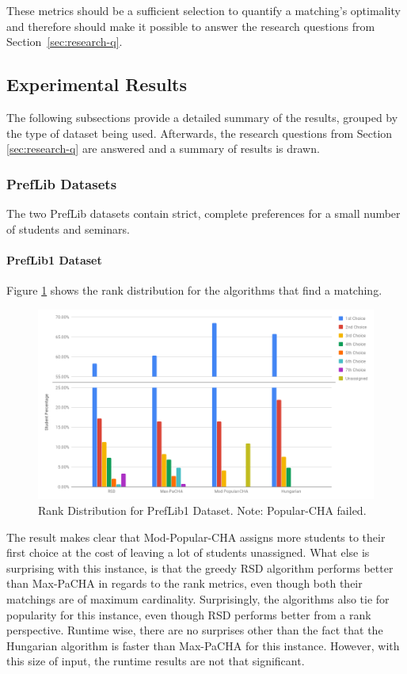 These metrics should be a sufficient selection to quantify a matching's optimality and therefore should make it possible to answer the research questions from \mbox{Section \ref{sec:research-q}.}

\subsection{Experimental Results}
The following subsections provide a detailed summary of the results, grouped by the type of dataset being used. Afterwards, the research questions from Section \ref{sec:research-q} are answered and a summary of results is drawn.

\subsubsection{PrefLib Datasets}
The two PrefLib datasets contain strict, complete preferences for a small number of students and seminars.

\paragraph{PrefLib1 Dataset}
Figure \ref{fig:preflib1-rank-distribution} shows the rank distribution for the algorithms that find a matching.

\begin{figure}[h!]
  \centering
    \includegraphics[width=0.75\linewidth]{assets/plots/preflib1-cropped.png}
    \caption{Rank Distribution for PrefLib1 Dataset. Note: Popular-CHA failed.}
    \label{fig:preflib1-rank-distribution}
\end{figure}

The result makes clear that Mod-Popular-CHA assigns more students to their first choice at the cost of leaving a lot of students unassigned. What else is surprising with this instance, is that the greedy RSD algorithm performs better than Max-PaCHA in regards to the rank metrics, even though both their matchings are of maximum cardinality. Surprisingly, the algorithms also tie for popularity for this instance, even though RSD performs better from a rank perspective. Runtime wise, there are no surprises other than the fact that the Hungarian algorithm is faster than Max-PaCHA for this instance. However, with this size of input, the runtime results are not that significant.

